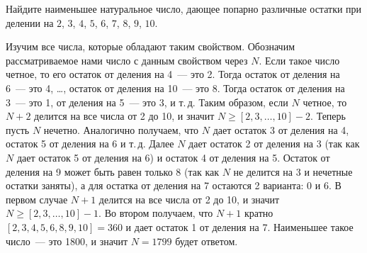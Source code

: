 Найдите наименьшее натуральное число, дающее попарно различные остатки при
делении на $2$, $3$, $4$, $5$, $6$, $7$, $8$, $9$, $10$.

\solution
\label{solution:2012/pers-algbr/junior/1}%
Изучим все числа, которые обладают таким свойством.
Обозначим рассматриваемое нами число с данным свойством через $N$.
Если такое число четное, то его остаток от деления на 4~--- это 2.
Тогда остаток от деления на 6~--- это 4, \ldots,
остаток от деления на 10~--- это 8.
Тогда остаток от деления на 3~--- это 1, от деления на 5~--- это 3, и т.\,д.
Таким образом, если $N$ четное, то $N + 2$ делится на все числа от 2 до 10, и
значит $N \geq [2, 3, \ldots, 10] - 2$.
Теперь пусть $N$ нечетно.
Аналогично получаем, что $N$ дает остаток 3 от деления на 4,
остаток 5 от деления на 6 и т.\,д.
Далее $N$ дает остаток 2 от деления на 3
(так как $N$ дает остаток 5 от деления на 6)
и остаток 4 от деления на 5.
Остаток от деления на 9 может быть равен только 8
(так как $N$ не делится на 3 и нечетные остатки заняты),
а для остатка от деления на 7 остаются 2 варианта: 0 и 6.
В первом случае $N + 1$ делится на все числа от 2 до 10, и значит
$N \geq [2, 3, \ldots, 10] - 1$.
Во втором получаем, что $N + 1$ кратно $[2, 3, 4, 5, 6, 8, 9, 10] = 360$ и дает
остаток 1 от деления на 7.
Наименьшее такое число~--- это 1800, и значит $N = 1799$ будет ответом.

